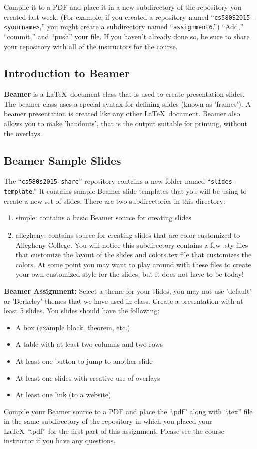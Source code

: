 Compile it to a PDF and place it in
a new subdirectory of the repository you created last week. (For example, if you
created a repository named ``{\tt cs580S2015-<yourname>},'' you might create a
subdirectory named ``{\tt assignment6}.'') ``Add,'' ``commit,'' and ``push''
your file. If you haven't already done so, be sure to share your repository
with all of the instructors for the course.

\newpage

\subsection*{Introduction to Beamer}
\textbf{Beamer} is a \LaTeX\ document class that is used to create presentation slides.
The beamer class uses a special syntax for defining slides (known as 'frames'). 
A beamer presentation is created like any other \LaTeX\ document. 
Beamer also allows you to make 'handouts', that is the output suitable for printing, without the overlays.

\subsection*{Beamer Sample Slides}
The ``{\tt cs580s2015-share}'' repository contains a new
folder named ``{\tt slides-template}.'' It contains sample Beamer slide templates that you will
be using to create a new set of slides. There are two subdirectories in this directory:
\begin{enumerate}
\item simple: contains a basic Beamer source for creating slides
\item allegheny: contains source for creating slides that are color-customized to Allegheny College. You will notice this subdirectory contains a few .sty files that customize the layout of the slides and colors.tex file that customizes the colors. At some point you may want to play around with these files to create your own customized style for the slides, but it does not have to be today!
\end{enumerate}

\textbf{Beamer Assignment:}
Select a theme for your slides, you may not use 'default' or 'Berkeley' themes that we have used in class. Create a presentation with at least 5 slides. You slides should have the following:
\begin{itemize} 
	\item A box (example block, theorem, etc.)
	\item A table with at least two columns and two rows
	\item At least one button to jump to another slide
	\item At least one slides with creative use of overlays
	\item At least one link (to a website)
\end{itemize}

Compile your Beamer source to a PDF and place the ``.pdf'' along with
``.tex'' file in the same subdirectory of the repository in which you
placed your \LaTeX\ ``.pdf'' for the first part of this assignment.
Please see the course instructor if you have any questions.


